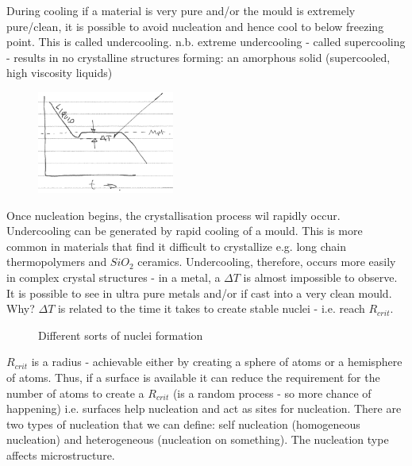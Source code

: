 \documentclass[class=report, crop=false, 12pt,a4paper]{standalone}
\begin{document}
During cooling if a material is very pure and/or the mould is extremely pure/clean, it is possible to avoid nucleation and hence cool to below freezing point. This is called undercooling. n.b. extreme undercooling - called supercooling - results in no crystalline structures forming: an amorphous solid (supercooled, high viscosity liquids)
\begin{figure}[h]
  \centering
  \includegraphics[width = 0.4\textwidth]{../img/supercooling}
\end{figure}
Once nucleation begins, the crystallisation process wil rapidly occur. Undercooling can be generated by rapid cooling of a mould. This is more common in materials that find it difficult to crystallize e.g. long chain thermopolymers and $SiO_2$ ceramics. Undercooling, therefore, occurs more easily in complex crystal structures - in a metal, a $\Delta T$ is almost impossible to observe. It is possible to see in ultra pure metals and/or if cast into a very clean mould. Why? $\Delta T$ is related to the time it takes to create stable nuclei - i.e. reach $R_{crit}$.
\begin{figure}[h]
  \centering
  \hfill
  \caption{Different sorts of nuclei formation}
\end{figure}
$R_{crit}$ is a radius - achievable either by creating a sphere of atoms or a hemisphere of atoms. Thus, if a surface is available it can reduce the requirement for the number of atoms to create a $R_{crit}$ (is a random process - so more chance of happening) i.e. surfaces help nucleation and act as sites for nucleation. There are two types of nucleation that we can define: self nucleation (homogeneous nucleation) and heterogeneous (nucleation on something). The nucleation type affects microstructure. 
\end{document}
